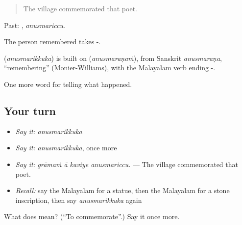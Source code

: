 \begin{quote}
The village commemorated that poet.
\end{quote}

Past: , \emph{anusmariccu}.

The person remembered takes -.

\begin{cousinweb}
\textbf{} (\emph{anusmarikkuka}) is built on  (\emph{anusmaraṇaṁ}), from Sanskrit \emph{anusmaraṇa}, \textquotedblleft{}remembering\textquotedblright{} (Monier-Williams), with the Malayalam verb ending -.
\end{cousinweb}

\begin{grammarlens}[title={What you've built}]
One more word for telling what happened.
\end{grammarlens}

\subsection*{Your turn}
\begin{itemize}
\raggedright
  \item \emph{Say it:} \emph{anusmarikkuka}
  \item \emph{Say it:} \emph{anusmarikkuka}, once more
  \item \emph{Say it:} \emph{grāmaṁ ā kaviye anusmariccu.} — The village commemorated that poet.
  \item \emph{Recall:} say the Malayalam for a statue, then the Malayalam for a stone inscription, then say \emph{anusmarikkuka} again
\end{itemize}

\begin{tcolorbox}[breakable,colback=teal!4,colframe=teal!35!black,title={Before you move on}]
What does  mean? (\textquotedblleft{}To commemorate\textquotedblright{}.) Say it once more.
\end{tcolorbox}
